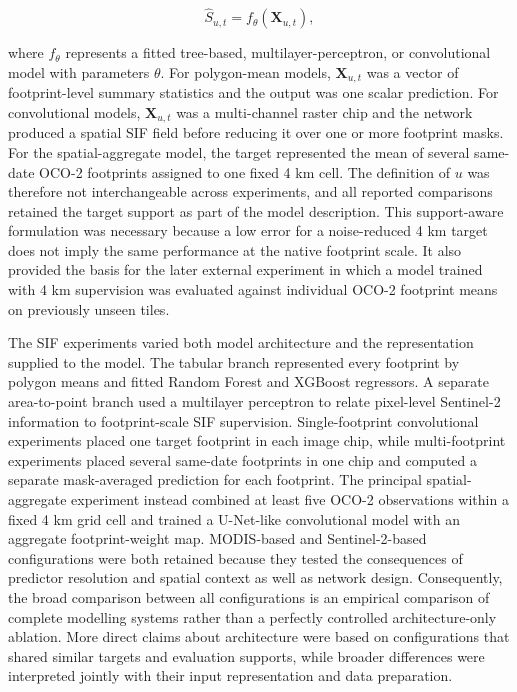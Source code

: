 \begin{equation}
    \widehat{S}_{u,t} = f_{\theta}\!\left(\mathbf{X}_{u,t}\right),
    \label{eq:general_sif_mapping}
\end{equation}

where $f_{\theta}$ represents a fitted tree-based, multilayer-perceptron, or convolutional model with parameters $\theta$. For polygon-mean models, $\mathbf{X}_{u,t}$ was a vector of footprint-level summary statistics and the output was one scalar prediction. For convolutional models, $\mathbf{X}_{u,t}$ was a multi-channel raster chip and the network produced a spatial SIF field before reducing it over one or more footprint masks. For the spatial-aggregate model, the target represented the mean of several same-date OCO-2 footprints assigned to one fixed 4 km cell. The definition of $u$ was therefore not interchangeable across experiments, and all reported comparisons retained the target support as part of the model description. This support-aware formulation was necessary because a low error for a noise-reduced 4 km target does not imply the same performance at the native footprint scale. It also provided the basis for the later external experiment in which a model trained with 4 km supervision was evaluated against individual OCO-2 footprint means on previously unseen tiles.

The SIF experiments varied both model architecture and the representation supplied to the model. The tabular branch represented every footprint by polygon means and fitted Random Forest and XGBoost regressors. A separate area-to-point branch used a multilayer perceptron to relate pixel-level Sentinel-2 information to footprint-scale SIF supervision. Single-footprint convolutional experiments placed one target footprint in each image chip, while multi-footprint experiments placed several same-date footprints in one chip and computed a separate mask-averaged prediction for each footprint. The principal spatial-aggregate experiment instead combined at least five OCO-2 observations within a fixed 4 km grid cell and trained a U-Net-like convolutional model with an aggregate footprint-weight map. MODIS-based and Sentinel-2-based configurations were both retained because they tested the consequences of predictor resolution and spatial context as well as network design. Consequently, the broad comparison between all configurations is an empirical comparison of complete modelling systems rather than a perfectly controlled architecture-only ablation. More direct claims about architecture were based on configurations that shared similar targets and evaluation supports, while broader differences were interpreted jointly with their input representation and data preparation.

